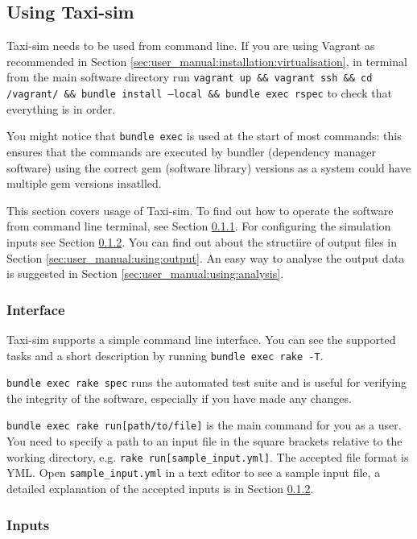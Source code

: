 \subsection{Using Taxi-sim}
\label{sec:user_manual:using}

Taxi-sim needs to be used from command line. If you are using Vagrant as
recommended in Section \ref{sec:user_manual:installation:virtualisation}, in
terminal from the main software directory run \texttt{vagrant up \&\& vagrant
ssh \&\& cd /vagrant/ \&\& bundle install --local \&\& bundle exec rspec} to
check that everything is in order.

You might notice that \texttt{bundle exec} is used at the start of most
commands: this ensures that the commands are executed by bundler (dependency
manager software) using the correct gem (software library) versions as a system
could have multiple gem versions insatlled.

This section covers usage of Taxi-sim. To find out how to operate the software
from command line terminal, see Section \ref{sec:user_manual:using:interface}.
For configuring the simulation inputs see Section
\ref{sec:user_manual:using:inputs}. You can find out about the structiire of
output files in Section \ref{sec:user_manual:using:output}. An easy way to
analyse the output data is suggested in Section
\ref{sec:user_manual:using:analysis}.

\subsubsection{Interface}
\label{sec:user_manual:using:interface}

Taxi-sim supports a simple command line interface. You can see the supported
tasks and a short description by running \texttt{bundle exec rake -T}.

\texttt{bundle exec rake spec} runs the automated test suite and is useful for
verifying the integrity of the software, especially if you have made any
changes.

\texttt{bundle exec rake run[path/to/file]} is the main command for you as a
user. You need to specify a path to an input file in the square brackets
relative to the working directory, e.g. \texttt{rake run[sample\_input.yml]}.
The accepted file format is YML. Open \texttt{sample\_input.yml} in a text
editor to see a sample input file, a detailed explanation of the accepted
inputs is in Section \ref{sec:user_manual:using:inputs}.


\subsubsection{Inputs}
\label{sec:user_manual:using:inputs}

